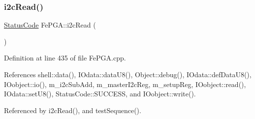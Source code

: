 \subsubsection{\texorpdfstring{i2c\+Read()}{i2cRead()}\hspace{0.1cm}{\footnotesize\ttfamily [1/2]}}
{\footnotesize\ttfamily \hyperlink{classStatusCode}{Status\+Code} Fe\+P\+G\+A\+::i2c\+Read (\begin{DoxyParamCaption}{ }\end{DoxyParamCaption})}



Definition at line 435 of file Fe\+P\+G\+A.\+cpp.



References shell\+::data(), I\+Odata\+::data\+U8(), Object\+::debug(), I\+Odata\+::def\+Data\+U8(), I\+Oobject\+::io(), m\+\_\+i2c\+Sub\+Add, m\+\_\+master\+I2c\+Reg, m\+\_\+setup\+Reg, I\+Oobject\+::read(), I\+Odata\+::set\+U8(), Status\+Code\+::\+S\+U\+C\+C\+E\+SS, and I\+Oobject\+::write().



Referenced by i2c\+Read(), and test\+Sequence().


